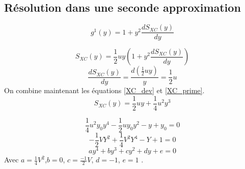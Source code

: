 \documentclass{beamer}
\begin{document}
\subsection{R\'esolution dans une seconde approximation}
\begin{frame}
\begin{equation} 
\label{gamma} 
	g^1(y) = 1 + y^2 \frac{dS_{XC}(y)}{dy} 
\end{equation}

\begin{equation} 
\label{XC_dev}
	S_{XC}(y) = \frac{1}{2} u y (1 + y^2 \frac{dS_{XC}(y)}{dy})
\end{equation}
\begin{equation} 
\label{XC_prime} 
	\frac{dS_{XC}(y)}{dy} = \frac{d(\frac{1}{2} u y )}{y} = \frac{1}{2} u 
\end{equation}
On combine maintenant les \'equations \ref{XC_dev}  et \ref{XC_prime}.
\begin{equation}
\label{XC_final} 
	S_{XC}(y) = \frac{1}{2} u y + \frac{1}{4} u^2 y^3 
\end{equation} 
\end{frame}


\begin{frame}
 \begin{equation}
	\frac{1}{4} u^2 y_0 y^4 -\frac{1}{2} u y_0 y^2 - y + y_0 = 0
\end{equation}
\begin{equation}
     -\frac{1}{2} V Y^2 +\frac{1}{4} V^2 Y^4 -Y +1 = 0
\end{equation}
\begin{equation}
 a y^4 + b y^3 + c y^2 + d y + e = 0
\end{equation}
\newline
Avec $a = \frac{1}{4}V^2$,$b = 0$, $c=\frac{-1}{2}V$, $d = -1$, $e=1$ .
\end{frame}
\end{document}
